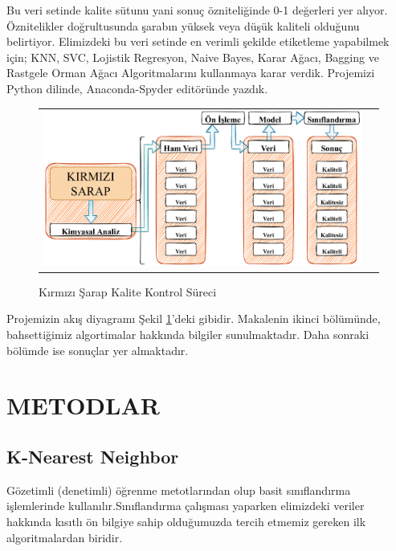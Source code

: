 \documentclass[conference]{IEEEtran}
\begin{document}
\quad Bu veri setinde kalite sütunu yani sonuç özniteliğinde 0-1 değerleri yer alıyor. Öznitelikler doğrultusunda şarabın yüksek veya düşük kaliteli olduğunu belirtiyor. Elimizdeki bu veri setinde en verimli şekilde etiketleme yapabilmek için; KNN, SVC, Lojistik Regresyon, Naive Bayes, Karar Ağacı, Bagging ve Rastgele Orman Ağacı Algoritmalarını kullanmaya karar verdik. Projemizi Python dilinde, Anaconda-Spyder editöründe yazdık.
\pagebreak
\begin{figure}[!h]
	\centering%
	\begin{center}
		\begin{tabular}{cc}%
			\includegraphics[scale=0.2]{pictures/pic_01.png}&%
		\end{tabular}%
	\end{center}
	\caption{Kırmızı Şarap Kalite Kontrol Süreci}%
	\label{fig:01}
\end{figure}

Projemizin akış diyagramı Şekil \ref{fig:01}'deki gibidir. Makalenin ikinci bölümünde, bahsettiğimiz algortimalar hakkında bilgiler sunulmaktadır. Daha sonraki bölümde ise sonuçlar yer almaktadır.


\section{\textbf{METODLAR}}
\subsection{\textbf{K-Nearest Neighbor}}
\quad Gözetimli (denetimli) öğrenme metotlarından olup  basit sınıflandırma işlemlerinde kullanılır\cite{8}\cite{9}.Sınıflandırma çalışması yaparken elimizdeki veriler hakkında kısıtlı ön bilgiye sahip olduğumuzda tercih etmemiz gereken ilk algoritmalardan biridir\cite{8}.
\end{document}
